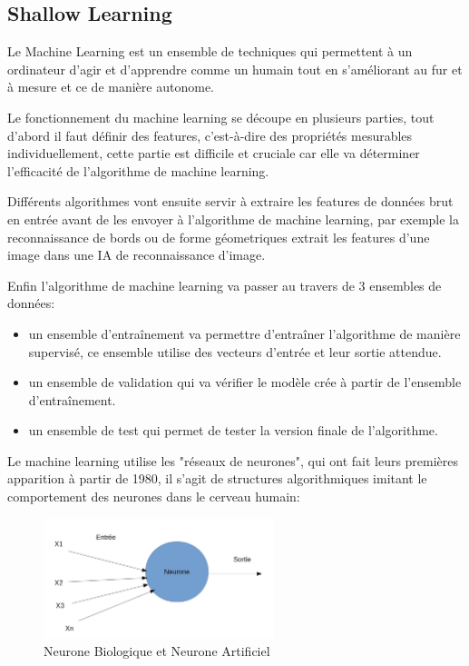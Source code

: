         \subsection{Shallow Learning}
            Le Machine Learning est un ensemble de techniques qui permettent à un ordinateur
            d'agir et d'apprendre comme un humain tout en s'améliorant au fur et
            à mesure et ce de manière autonome. \newline

            Le fonctionnement du machine learning se découpe en plusieurs parties,
            tout d'abord il faut définir des features, c'est-à-dire des
            propriétés mesurables individuellement, cette partie est difficile et cruciale
            car elle va déterminer l'efficacité de l'algorithme de machine learning. \newline

            Différents algorithmes vont ensuite servir à extraire les features de données
            brut en entrée avant de les envoyer à l'algorithme de machine learning, par exemple
            la reconnaissance de bords ou de forme géometriques extrait les features d'une
            image dans une IA de reconnaissance d'image. \newline

            Enfin l'algorithme de machine learning va passer au travers de 3 ensembles de données:
            \begin{itemize}
                \item un ensemble d'entraînement va permettre d'entraîner l'algorithme de manière
                supervisé, ce ensemble utilise des vecteurs d'entrée et leur sortie attendue.
                \item un ensemble de validation qui va vérifier le modèle crée à partir de l'ensemble
                d'entraînement.
                \item un ensemble de test qui permet de tester la version finale de l'algorithme.
                \newline
            \end{itemize}

            Le machine learning utilise les "réseaux de neurones", qui ont fait leurs premières
            apparition à partir de 1980, il s'agit de structures algorithmiques imitant
            le comportement des neurones dans le cerveau humain:


            \begin{figure}[H]
                \centering
                \includegraphics[width=0.6\textwidth]{Images/neuroneartificiel}
                \caption{Neurone Biologique et Neurone Artificiel}
                \label{fig:NN2Layers}
            \end{figure}

